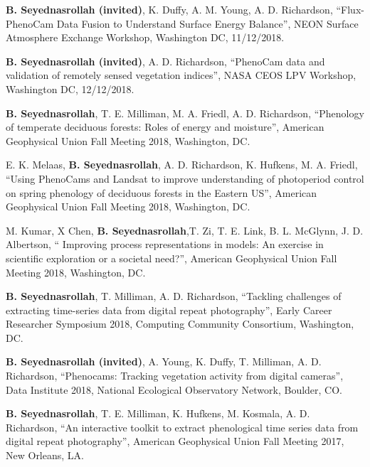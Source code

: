 \documentclass[10pt]{article}
\newenvironment{changemargin}[2]{%
  \begin{list}{}{%
    \setlength{\topsep}{0pt}%
    \setlength{\leftmargin}{#1}%
    \setlength{\rightmargin}{#2}%
    \setlength{\listparindent}{\parindent}%
    \setlength{\itemindent}{\parindent}%
    \setlength{\parsep}{\parskip}%
  }%
  \item[]}{\end{list}
}
\newenvironment{body} {
	\vspace*{-2pt}
	\begin{changemargin}{-0.5in}{-0.5in}
  }
	{\end{changemargin}
}
\begin{document}
\begin{body}


\textbf{B. Seyednasrollah (invited)}, K. Duffy, A. M. Young, A. D. Richardson, ``Flux-PhenoCam Data Fusion to Understand Surface Energy Balance'', NEON Surface Atmosphere Exchange Workshop, Washington DC, 11/12/2018. \\
\medskip

\textbf{B. Seyednasrollah (invited)}, A. D. Richardson, ``PhenoCam data and validation of remotely sensed vegetation indices'', NASA CEOS LPV Workshop, Washington DC, 12/12/2018. \\
\medskip

\textbf{B. Seyednasrollah}, T. E. Milliman, M. A. Friedl, A. D. Richardson, ``Phenology of temperate deciduous forests: Roles of energy and moisture'', American Geophysical Union Fall Meeting 2018, Washington, DC.\\
\medskip


E. K. Melaas, \textbf{B. Seyednasrollah}, A. D. Richardson, K. Hufkens, M. A. Friedl, ``Using PhenoCams and Landsat to improve understanding of photoperiod control on spring phenology of deciduous forests in the Eastern US'', American Geophysical Union Fall Meeting 2018, Washington, DC.\\
\medskip

M. Kumar, X Chen, \textbf{B. Seyednasrollah},T. Zi, T. E. Link, B. L. McGlynn, J. D. Albertson, `` Improving process representations in models: An exercise in scientific exploration or a societal need?'', American Geophysical Union Fall Meeting 2018, Washington, DC.\\
\medskip
 
 

   \textbf{B. Seyednasrollah}, T. Milliman, A. D. Richardson, ``Tackling challenges of extracting time-series data from digital repeat photography'', Early Career Researcher Symposium 2018, Computing Community Consortium, Washington, DC.\\
\medskip

  \textbf{B. Seyednasrollah (invited)}, A. Young, K. Duffy, T. Milliman, A. D. Richardson, ``Phenocams: Tracking vegetation activity from digital cameras'', Data Institute 2018, National Ecological Observatory Network, Boulder, CO.\\
\medskip

   \textbf{B. Seyednasrollah}, T. E. Milliman, K. Hufkens, M. Kosmala, A. D. Richardson, ``An interactive toolkit to extract phenological time series data from digital repeat photography'', American Geophysical Union Fall Meeting 2017, New Orleans, LA.\\
\medskip


\end{body}
\end{document}
